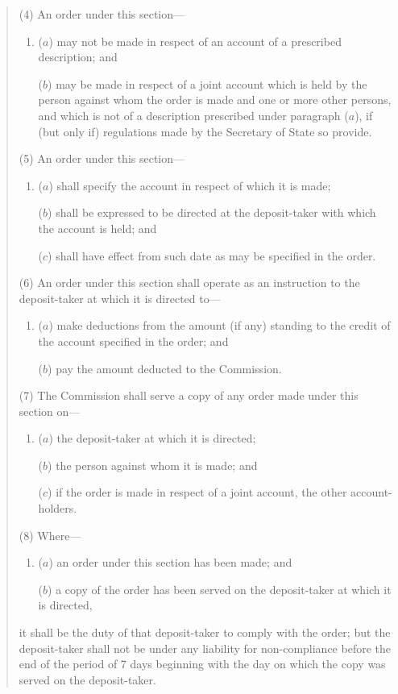 \documentclass[12pt,a4paper]{article}
\begin{document}
\begin{quotation}
(4) An order under this section---
\begin{enumerate}\item[]
($a$) may not be made in respect of an account of a prescribed description; and

($b$) may be made in respect of a joint account which is held by the person against whom the order is made and one or more other persons, and which is not of a description prescribed under paragraph ($a$), if (but only if) regulations made by the Secretary of State so provide.
\end{enumerate}

(5) An order under this section---
\begin{enumerate}\item[]
($a$) shall specify the account in respect of which it is made;

($b$) shall be expressed to be directed at the deposit-taker with which the account is held; and

($c$) shall have effect from such date as may be specified in the order.
\end{enumerate}

(6) An order under this section shall operate as an instruction to the deposit-taker at which it is directed to---
\begin{enumerate}\item[]
($a$) make deductions from the amount (if any) standing to the credit of the account specified in the order; and

($b$) pay the amount deducted to the Commission.
\end{enumerate}

(7) The Commission shall serve a copy of any order made under this section on---
\begin{enumerate}\item[]
($a$) the deposit-taker at which it is directed;

($b$) the person against whom it is made; and

($c$) if the order is made in respect of a joint account, the other account-holders.
\end{enumerate}

(8)
Where---
\begin{enumerate}\item[]
($a$)
an order under this section has been made; and

($b$)
a copy of the order has been served on the deposit-taker at which it is directed, 
\end{enumerate}
it shall be the duty of that deposit-taker to comply with the order; but the deposit-taker shall not be under any liability for non-compliance before the end of the period of 7 days beginning with the day on which the copy was served on the deposit-taker.


\end{quotation}
\end{document}
